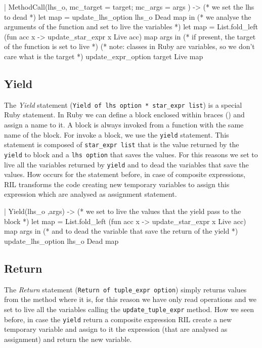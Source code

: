 \documentclass[a4paper]{article}   %
\begin{document}
\begin{ocaml}
| MethodCall(lhs_o, {mc_target = target; mc_args = args} ) -> 
    (* we set the lhs to dead *)
    let map = update_lhs_option lhs_o Dead map in
    (* we analyse the arguments of the function and set to live the variables *) 
    let map = List.fold_left (fun acc x -> update_star_expr x Live acc) map args in
    (* if present, the target of the function is set to live *)
    (* note: classes in Ruby are variables, so we don't care what is the target *)
    update_expr_option target Live map
\end{ocaml}

\pagebreak 

\subsection{Yield}
The \emph{Yield} statement (\texttt{Yield of lhs option * star\_expr list}) is a special Ruby statement.
In Ruby we can define a block enclosed within braces ({}) and assign a name to it. A block is always invoked from a function with the same name of the block. For invoke a block, we use the \texttt{yield} statement.
This statement is composed of \texttt{star\_expr list} that is the value returned by the \texttt{yield} to block and a \texttt{lhs option} that saves the values. For this reasons we set to live all the variables returned by \texttt{yield} and to dead the variables that save the values.
How occurs for the statement before, in case of composite expressions, RIL transforms the code creating new temporary variables to assign this expression which are analysed as assignment statement.

\begin{ocaml}
| Yield(lhs_o ,args) -> 
    (* we set to live the values that the yield pass to the block *)
    let map = List.fold_left (fun acc x -> update_star_expr x Live acc) map args in
    (* and to dead the variable that save the return of the yield *)
    update_lhs_option lhs_o Dead map
\end{ocaml}

\subsection{Return}
The \emph{Return} statement (\texttt{Return of tuple\_expr option}) simply returns values from the method where it is, for this reason we have only read operations and we set to live all the variables calling the \texttt{update\_tuple\_expr} method. How we seen before, in case the \texttt{yield} return a composite expression RIL create a new temporary variable and assign to it the expression (that are analysed as assignment) and return the new variable.
\end{document}
